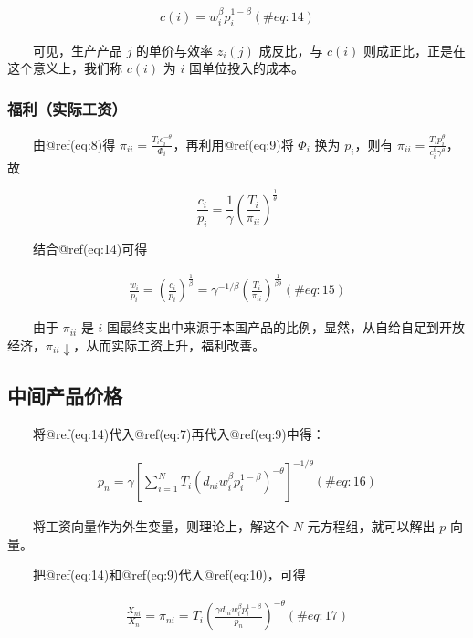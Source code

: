 \documentclass[]{tufte-handout}
\begin{document}
\begin{align}
c(i)=w_{i}^{\beta}p_{i}^{1-\beta} (\#eq:14)
\end{align}

　　可见，生产产品 \(j\) 的单价与效率 \(z_{i}(j)\) 成反比，与 \(c(i)\)
则成正比，正是在这个意义上，我们称 \(c(i)\) 为 \(i\) 国单位投入的成本。

\hypertarget{ux798fux5229ux5b9eux9645ux5de5ux8d44}{%
\subsubsection{福利（实际工资）}\label{ux798fux5229ux5b9eux9645ux5de5ux8d44}}

　　由@ref(eq:8)得
\(\pi_{ii}=\frac{T_{i}c_{i}^{-\theta}}{\Phi_{i}}\)，再利用@ref(eq:9)将
\(\Phi_{i}\) 换为 \(p_{i}\)，则有
\(\pi_{ii}=\frac{T_{i}p_{i}^{\theta}}{c_{i}^{\theta}\gamma^{\theta}}\)，故

\[\frac{c_i}{p_i}=\frac{1}{\gamma}\left(\frac{T_i}{\pi_{ii}}\right)^{\frac{1}{\theta}}\]

　　结合@ref(eq:14)可得

\begin{align}
\frac{w_i}{p_i}=\left(\frac{c_i}{p_{i}}\right)^{\frac{1}{\beta}}=\gamma^{-1/\beta}\left(\frac{T_i}{\pi_{ii}}\right)^{\frac{1}{\beta\theta}} (\#eq:15)
\end{align}

　　由于 \(\pi_{ii}\) 是 \(i\)
国最终支出中来源于本国产品的比例，显然，从自给自足到开放经济，\(\pi_{ii} \downarrow\)，从而实际工资上升，福利改善。

\hypertarget{ux4e2dux95f4ux4ea7ux54c1ux4ef7ux683c}{%
\subsection{中间产品价格}\label{ux4e2dux95f4ux4ea7ux54c1ux4ef7ux683c}}

　　将@ref(eq:14)代入@ref(eq:7)再代入@ref(eq:9)中得：

\begin{align}
p_{n}=\gamma\left[\sum_{i=1}^{N} T_{i}\left(d_{n i} w_{i}^{\beta} p_{i}^{1-\beta}\right)^{-\theta}\right]^{-1 / \theta} (\#eq:16)
\end{align}

　　将工资向量作为外生变量，则理论上，解这个 \(N\) 元方程组，就可以解出
\(p\) 向量。

　　把@ref(eq:14)和@ref(eq:9)代入@ref(eq:10)，可得

\begin{align}
\frac{X_{n i}}{X_{n}}=\pi_{n i}=T_{i}\left(\frac{\gamma d_{n i} w_{i}^{\beta} p_{i}^{1-\beta}}{p_{n}}\right)^{-\theta} (\#eq:17)
\end{align}
\end{document}
